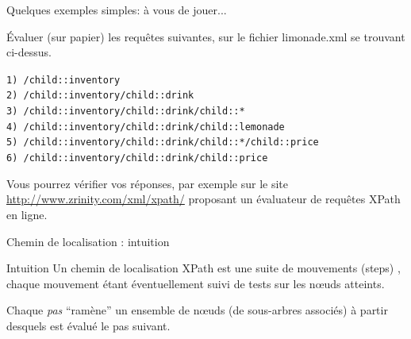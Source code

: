 \begin{frame}{Quelques exemples simples: \`a vous de jouer...}

\vspace{-0.3cm}

\begin{footnotesize}



\vspace{-0.3cm}

\begin{exoblock}

\'Evaluer (sur papier) les requêtes suivantes, sur le fichier limonade.xml se trouvant ci-dessus.

\noindent \texttt{1) /child::inventory \\
2) /child::inventory/child::drink \\
3) /child::inventory/child::drink/child::*\\
4) /child::inventory/child::drink/child::lemonade\\
5) /child::inventory/child::drink/child::*/child::price\\
6) /child::inventory/child::drink/child::price\\
}

Vous pourrez vérifier vos réponses, par exemple sur le site \url{http://www.zrinity.com/xml/xpath/} proposant un évaluateur de requêtes XPath en ligne.
\end{exoblock}
\end{footnotesize}

\end{frame}


\begin{frame}{Chemin de localisation : intuition}

\begin{block}{Intuition}
Un chemin de localisation XPath est une suite de mouvements (steps) , chaque mouvement \'etant \'eventuellement suivi de tests sur les n{\oe}uds atteints.
\end{block}

\medskip

Chaque \textit{pas} ``ram\`ene'' un ensemble de n{\oe}uds (de sous-arbres associés) à partir desquels est évalué le pas suivant. 

\end{frame}


